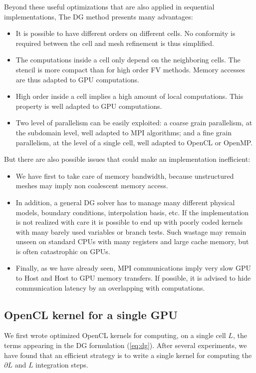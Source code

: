 \documentclass[preprint]{sig-alternate}
\begin{document}
Beyond these useful optimizations that are also applied in sequential implementations, The DG method presents many advantages:

\begin{itemize}
\item It is possible to have different orders on different cells. No conformity is required between the cell and mesh refinement is thus simplified.
\item The computations inside a cell only depend on the neighboring cells. The stencil is more compact than for high order FV methods. Memory accesses are thus adapted to GPU computations.
\item High order inside a cell implies a high amount of local computations. This property is well adapted to GPU computations.
\item Two level of parallelism can be easily exploited: a coarse grain parallelism, at the subdomain level, well adapted to MPI algorithms; and a fine grain parallelism, at the level of a single cell, well adapted to OpenCL or OpenMP.
\end{itemize}

But there are also possible issues that could make an implementation inefficient:
\begin{itemize}
\item  We have first to take care of memory bandwidth, because unstructured meshes may imply non coalescent memory access.
\item In addition, a general DG solver has to manage many different physical models, boundary conditions, interpolation basis, etc. If the implementation is not realized with care it is possible to end up with poorly coded kernels with many barely used variables or branch tests. Such wastage may remain unseen on standard CPUs with many registers  and large cache memory, but is often catastrophic on GPUs.
\item Finally, as we have already seen, MPI communications imply very slow GPU to Host and Host to GPU memory transfers. If possible, it is advised to hide communication latency by an overlapping with computations.
\end{itemize}

\subsection{OpenCL kernel for a single GPU}
We first wrote optimized OpenCL kernels for computing, on a single cell $L$, the terms appearing in the DG formulation (\ref{eq:dg}).
After several experiments, we have found that an efficient strategy is to write
a single kernel for computing the $\partial L$ and $L$ integration steps.
\end{document}
